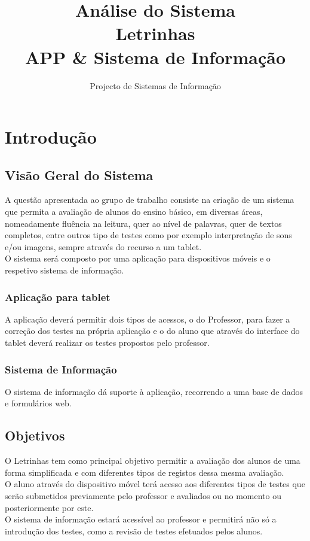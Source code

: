 \documentclass[a4paper]{article}
\title{Análise do Sistema \\ Letrinhas \\ APP \& Sistema de Informação }
\author{Projecto de Sistemas de Informação}
\begin{document}
	\maketitle %
  
	\newpage
	\tableofcontents %
	\newpage %

	 \section{Introdução}%
		\subsection{Visão Geral do Sistema}
		 
		A questão apresentada ao grupo de trabalho consiste na criação de um sistema que permita a avaliação de alunos do ensino básico, em diversas áreas, nomeadamente fluência na leitura, quer ao nível de palavras, quer de textos completos, entre outros tipo de testes como por exemplo interpretação de sons e/ou imagens, sempre através do recurso a um tablet.\\ 

		O sistema será composto por uma aplicação para dispositivos móveis e o respetivo sistema de informação.

		\subsubsection{Aplicação para tablet}
		A aplicação deverá permitir dois tipos de acessos, o do Professor, para fazer a correção dos testes na própria aplicação e o do aluno que através do interface do tablet deverá realizar os testes propostos pelo professor.
		
		\subsubsection{Sistema de Informação}
		O sistema de informação dá suporte à aplicação, recorrendo a uma base de dados e formulários web.

		\subsection{Objetivos}
		
		O Letrinhas tem como principal objetivo permitir a avaliação dos alunos de uma forma simplificada e com diferentes tipos de registos dessa mesma avaliação.\\
		O aluno através do dispositivo móvel terá acesso aos diferentes tipos de testes que serão submetidos previamente pelo professor e avaliados ou no momento ou posteriormente por este. \\
		O sistema de informação estará acessível ao professor e permitirá não só a introdução dos testes, como a revisão de testes efetuados pelos alunos.  
\end{document}
